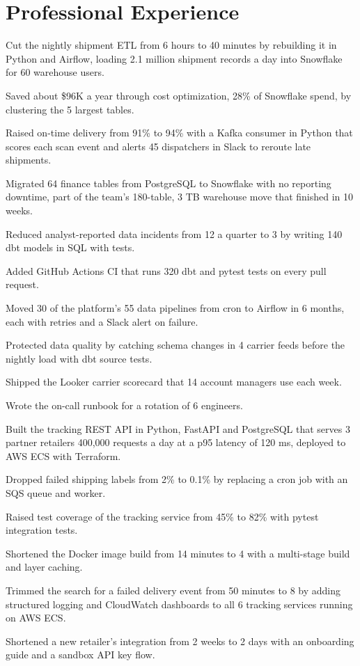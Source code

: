\documentclass{resume}
\begin{document}
\section{Professional Experience}
\begin{bullets}
  \item Cut the nightly shipment ETL from 6 hours to 40 minutes by rebuilding it in Python and Airflow, loading 2.1 million shipment records a day into Snowflake for 60 warehouse users.
  \item Saved about \$96K a year through cost optimization, 28\% of Snowflake spend, by clustering the 5 largest tables.
  \item Raised on-time delivery from 91\% to 94\% with a Kafka consumer in Python that scores each scan event and alerts 45 dispatchers in Slack to reroute late shipments.
  \item Migrated 64 finance tables from PostgreSQL to Snowflake with no reporting downtime, part of the team's 180-table, 3 TB warehouse move that finished in 10 weeks.
  \item Reduced analyst-reported data incidents from 12 a quarter to 3 by writing 140 dbt models in SQL with tests.
  \item Added GitHub Actions CI that runs 320 dbt and pytest tests on every pull request.
  \item Moved 30 of the platform's 55 data pipelines from cron to Airflow in 6 months, each with retries and a Slack alert on failure.
  \item Protected data quality by catching schema changes in 4 carrier feeds before the nightly load with dbt source tests.
  \item Shipped the Looker carrier scorecard that 14 account managers use each week.
  \item Wrote the on-call runbook for a rotation of 6 engineers.
\end{bullets}

\begin{bullets}
  \item Built the tracking REST API in Python, FastAPI and PostgreSQL that serves 3 partner retailers 400,000 requests a day at a p95 latency of 120 ms, deployed to AWS ECS with Terraform.
  \item Dropped failed shipping labels from 2\% to 0.1\% by replacing a cron job with an SQS queue and worker.
  \item Raised test coverage of the tracking service from 45\% to 82\% with pytest integration tests.
  \item Shortened the Docker image build from 14 minutes to 4 with a multi-stage build and layer caching.
  \item Trimmed the search for a failed delivery event from 50 minutes to 8 by adding structured logging and CloudWatch dashboards to all 6 tracking services running on AWS ECS.
  \item Shortened a new retailer's integration from 2 weeks to 2 days with an onboarding guide and a sandbox API key flow.
\end{bullets}
\end{document}
